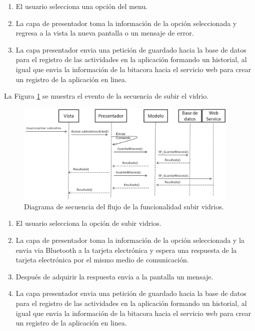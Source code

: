  \begin{enumerate}
\item El usuario selecciona una opción del menu.
\item La capa de presentador toma la información de la opción seleccionada y regresa a la vista la nueva pantalla o un mensaje de error.
\item La capa presentador envia una petición de guardado hacia la base de datos para el registro de las actividades en la aplicación formando un historial, al igual que envia la información de la bitacora hacia el servicio web para crear un registro de la aplicación en linea.
\end{enumerate}

La Figura \ref{ds4} se muestra el evento de la secuencia de subir el vidrio.\\
\begin{figure}[H]
\centering
\includegraphics[width=0.95\textwidth]{metodologia/DSSubirVidrios.jpg}
\caption{Diagrama de secuencia del flujo de la funcionalidad subir vidrios.}
\label{ds4}
\end{figure}
%
 \begin{enumerate}
\item El usuario selecciona la opción de subir vidrios.
\item La capa de presentador toma la información de la opción seleccionada y la envia via Bluetooth a la tarjeta electrónica y espera una respuesta de la tarjeta electrónica por el mismo medio de comunicación.
\item Después de adquirir la respuesta envia a la pantalla un mensaje.
\item La capa presentador envia una petición de guardado hacia la base de datos para el registro de las actividades en la aplicación formando un historial, al igual que envia la información de la bitacora hacia el servicio web para crear un registro de la aplicación en linea.
\end{enumerate}

